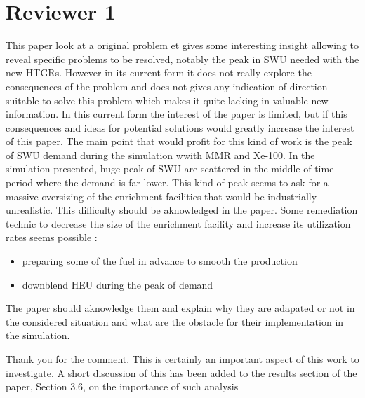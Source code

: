 \documentclass[answers,11pt]{exam}
\begin{document}
\section*{Reviewer 1}
\begin{questions}

        \question This paper look at a original problem et gives some 
        interesting insight allowing to reveal specific problems to be resolved, 
        notably the peak in SWU needed with the new HTGRs. However in its 
        current form it does not really explore the consequences of the problem 
        and does not gives any indication of direction suitable to solve this 
        problem which makes it quite lacking in valuable new information.
        In this current form the interest of the paper is limited, but if this 
        consequences and ideas for potential solutions would greatly increase 
        the interest of this paper. The main point that would profit for this 
        kind of work is the peak of SWU demand during the simulation wwith MMR 
        and Xe-100. In the simulation presented, huge peak of SWU are scattered 
        in the middle of time period where the demand is far lower. This kind of 
        peak seems to ask for a massive oversizing of the enrichment facilities 
        that would be industrially unrealistic. This difficulty should be 
        aknowledged in the paper. Some remediation technic to decrease the 
        size of the enrichment facility and increase its utilization rates seems 
        possible :
        \begin{itemize}
                \item preparing some of the fuel in advance to smooth the production
                \item downblend HEU during the peak of demand 
        \end{itemize}
        The paper should aknowledge them and explain why they are adapated or 
        not in the considered situation and what are the obstacle for their 
        implementation in the simulation.
        \begin{solution}
                Thank you for the comment. This is certainly an important aspect of 
                this work to investigate. A short discussion of this has been added 
                to the results section of the paper, Section 3.6, on the importance 
                of such analysis
        \end{solution}


\end{questions}
\end{document}

